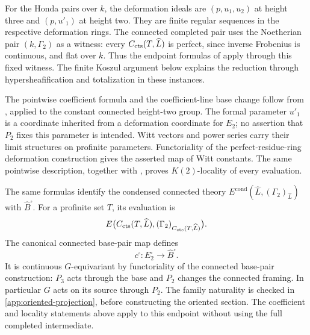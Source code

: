 For the Honda pairs over \(k\), the deformation ideals are
\((p,u_1,u_2)\) at height three and \((p,u'_1)\) at height two.
They are finite regular sequences in the respective deformation rings.
The connected completed pair uses the Noetherian pair
\((k,\Gamma_2)\) as a witness: every
\(C_{\mathrm{cts}}(T,\widehat L)\) is perfect, since inverse Frobenius is
continuous, and flat over \(k\). Thus the endpoint formulas of
\cite[Proposition~4.5.5]{BMR2026} apply through this fixed witness.
The finite Koszul argument below explains the reduction through
hypersheafification and totalization in these instances.

The pointwise coefficient formula and the coefficient-line base change
follow from \cite[Lemma 4.2.12 and Proposition 4.5.5]{BMR2026}, applied to
the constant connected height-two group.  The formal parameter $u'_1$
is a coordinate inherited from a deformation coordinate for $E_2$; no
assertion that $P_2$ fixes this parameter is intended.  Witt vectors and
power series carry their limit structures on profinite parameters.
Functoriality of the perfect-residue-ring deformation construction gives
the asserted map of Witt constants.  The same pointwise description,
together with \cite[Proposition 4.4.2]{BMR2026}, proves $K(2)$-locality
of every evaluation.

The same formulas identify the condensed connected theory
\(E^{\mathrm{cond}}(\widehat L,(\Gamma_2)_{\widehat L})\)
with \(\widehat B^\square\). For a profinite set \(T\), its evaluation is
\[
 E\bigl(C_{\mathrm{cts}}(T,\widehat L),
        (\Gamma_2)_{C_{\mathrm{cts}}(T,\widehat L)}\bigr).
\]
The canonical connected
base-pair map defines
\[
 c^\square:E_2^\square\longrightarrow\widehat B^\square.
\]
It is continuous \(G\)-equivariant by functoriality of the connected
base-pair construction: \(P_3\) acts through the base and \(P_2\)
changes the connected framing. In particular \(G\) acts on its
source through \(P_2\). The family naturality is checked in
\cref{app:oriented-projection}, before constructing the oriented section.
The coefficient and locality statements above apply to this endpoint
without using the full completed intermediate.

